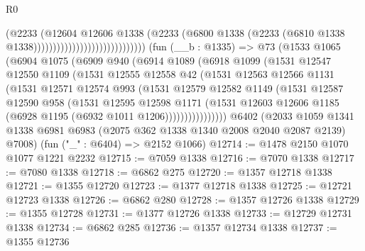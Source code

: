 \begin{lexlean}{R0}
\begin{coremodule}
                                                  (@2233
                                                    (@12604
                                                      @12606
                                                      @1338
                                                      (@2233
                                                        (@6800
                                                          @1338
                                                          (@2233
                                                            (@6810
                                                              @1338
                                                              @1338)))))))))))))))))))))))))))))
    (fun (__b : @1335) =>
    @73
      (@1533
        @1065
        (@6904
          @1075
          (@6909
            @940
            (@6914
              @1089
              (@6918
                @1099
                (@1531
                  @12547
                  @12550
                  @1109
                  (@1531
                    @12555
                    @12558
                    @42
                    (@1531
                      @12563
                      @12566
                      @1131
                      (@1531
                        @12571
                        @12574
                        @993
                        (@1531
                          @12579
                          @12582
                          @1149
                          (@1531
                            @12587
                            @12590
                            @958
                            (@1531
                              @12595
                              @12598
                              @1171
                              (@1531
                                @12603
                                @12606
                                @1185
                                (@6928 @1195 (@6932 @1011 @1206))))))))))))))))
    @6402
    (@2033 @1059 @1341 @1338 @6981 @6983 (@2075 @362 @1338 @1340 @2008 @2040 @2087 @2139) @7008)
    (fun ("_" : @6404) => @2152 @1066)
@12714 := @1478 @2150 @1070 @1077 @1221 @2232
@12715 := @7059 @1338
@12716 := @7070 @1338
@12717 := @7080 @1338
@12718 := @6862 @275
@12720 := @1357 @12718 @1338
@12721 := @1355 @12720
@12723 := @1377 @12718 @1338
@12725 := @12721 @12723 @1338
@12726 := @6862 @280
@12728 := @1357 @12726 @1338
@12729 := @1355 @12728
@12731 := @1377 @12726 @1338
@12733 := @12729 @12731 @1338
@12734 := @6862 @285
@12736 := @1357 @12734 @1338
@12737 := @1355 @12736

\end{coremodule}
\end{lexlean}
